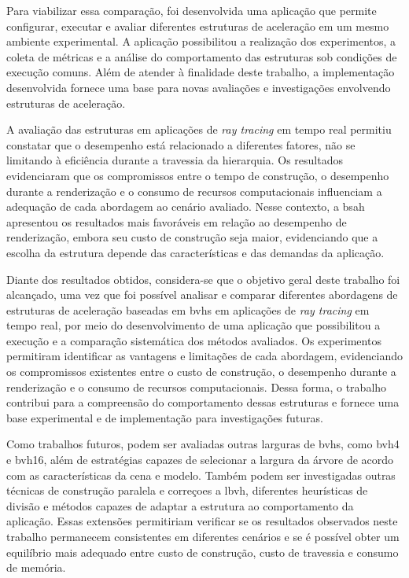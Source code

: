 Para viabilizar essa comparação, foi desenvolvida uma aplicação que permite configurar, executar e avaliar diferentes estruturas de aceleração em um mesmo ambiente experimental. A aplicação possibilitou a realização dos experimentos, a coleta de métricas e a análise do comportamento das estruturas sob condições de execução comuns. Além de atender à finalidade deste trabalho, a implementação desenvolvida fornece uma base para novas avaliações e investigações envolvendo estruturas de aceleração.

A avaliação das estruturas em aplicações de \textit{ray tracing} em tempo real permitiu constatar que o desempenho está relacionado a diferentes fatores, não se limitando à eficiência durante a travessia da hierarquia. Os resultados evidenciaram que os compromissos entre o tempo de construção, o desempenho durante a renderização e o consumo de recursos computacionais influenciam a adequação de cada abordagem ao cenário avaliado. Nesse contexto, a \gls{bsah} apresentou os resultados mais favoráveis em relação ao desempenho de renderização, embora seu custo de construção seja maior, evidenciando que a escolha da estrutura depende das características e das demandas da aplicação.

Diante dos resultados obtidos, considera-se que o objetivo geral deste trabalho foi alcançado, uma vez que foi possível analisar e comparar diferentes abordagens de estruturas de aceleração baseadas em \glspl{bvh} em aplicações de \textit{ray tracing} em tempo real, por meio do desenvolvimento de uma aplicação que possibilitou a execução e a comparação sistemática dos métodos avaliados. Os experimentos permitiram identificar as vantagens e limitações de cada abordagem, evidenciando os compromissos existentes entre o custo de construção, o desempenho durante a renderização e o consumo de recursos computacionais. Dessa forma, o trabalho contribui para a compreensão do comportamento dessas estruturas e fornece uma base experimental e de implementação para investigações futuras.

Como trabalhos futuros, podem ser avaliadas outras larguras de \glspl{bvh}, como \gls{bvh4} e \gls{bvh16}, além de estratégias capazes de selecionar a largura da árvore de acordo com as características da cena e modelo. Também podem ser investigadas outras técnicas de construção paralela e correçoes a \gls{lbvh}, diferentes heurísticas de divisão e métodos capazes de adaptar a estrutura ao comportamento da aplicação. Essas extensões permitiriam verificar se os resultados observados neste trabalho permanecem consistentes em diferentes cenários e se é possível obter um equilíbrio mais adequado entre custo de construção, custo de travessia e consumo de memória.

